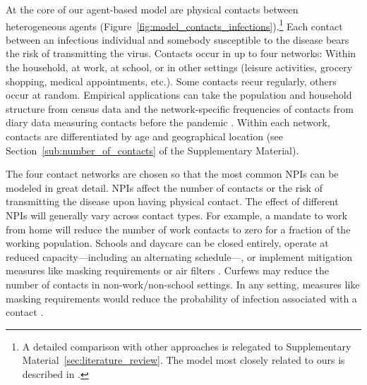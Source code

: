 At the core of our agent-based model are physical contacts between heterogeneous agents
(Figure~\ref{fig:model_contacts_infections}).\footnote{A detailed comparison with other
approaches  is relegated to Supplementary Material~\ref{sec:literature_review}. The
model most closely related to ours is described in \citet{Hinch2020}.} Each contact
between an infectious individual and somebody susceptible to the disease bears the risk
of transmitting the virus. Contacts occur in up to four networks: Within the household,
at work, at school, or in other settings (leisure activities, grocery shopping, medical
appointments, etc.). Some contacts recur regularly, others occur at random. Empirical
applications can take the population and household structure from census data and the
network-specific frequencies of contacts from diary data measuring contacts before the
pandemic \citep[e.g.][]{Mossong2008,Hoang2019}. Within each network, contacts are
differentiated by age and geographical location (see Section~\ref{sub:number_of_contacts}
of the Supplementary Material).

The four contact networks are chosen so that the most common NPIs can be modeled in
great detail. NPIs affect the number of contacts or the risk of transmitting the disease
upon having physical contact. The effect of different NPIs will generally vary across
contact types. For example, a mandate to work from home will reduce the number of work
contacts to zero for a fraction of the working population. Schools and daycare can be
closed entirely, operate at reduced capacity---including an alternating schedule---, or
implement mitigation measures like masking requirements or air filters
\citep{Lessler2021}. Curfews may reduce the number of contacts in non-work/non-school
settings. In any setting, measures like masking requirements would reduce the
probability of infection associated with a contact \citep{Cheng2021}.

